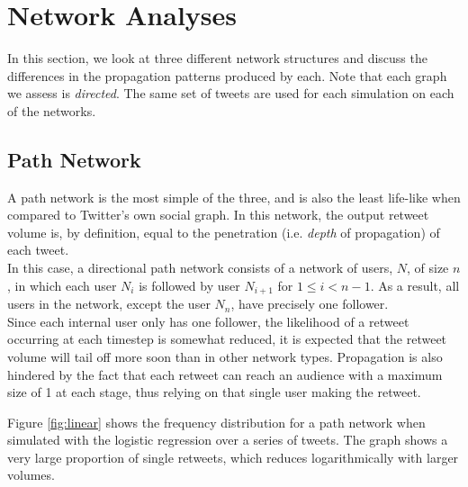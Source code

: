 \section{Network Analyses}
In this section, we look at three different network structures and discuss the differences in the propagation patterns produced by each. Note that each graph we assess is \textit{directed}. The same set of tweets are used for each simulation on each of the networks.

\subsection{Path Network}
A path network is the most simple of the three, and is also the least life-like when compared to Twitter's own social graph. In this network, the output retweet volume is, by definition, equal to the penetration (i.e. \emph{depth} of propagation) of each tweet.
\\
In this case, a directional path network consists of a network of users, $ N $, of size $ n $, in which each user $ N_i $ is followed by user $ N_{i+1} $ for $ 1 \le i < n-1 $. As a result, all users in the network, except the user $ N_n $, have precisely one follower.
\\
Since each internal user only has one follower, the likelihood of a retweet occurring at each timestep is somewhat reduced, it is expected that the retweet volume will tail off more soon than in other network types. Propagation is also hindered by the fact that each retweet can reach an audience with a maximum size of 1 at each stage, thus relying on that single user making the retweet.
\begin{figure}[h]
\end{figure}
Figure \ref{fig:linear} shows the frequency distribution for a path network when simulated with the logistic regression over a series of tweets. The graph shows a very large proportion of single retweets, which reduces logarithmically with larger volumes.
